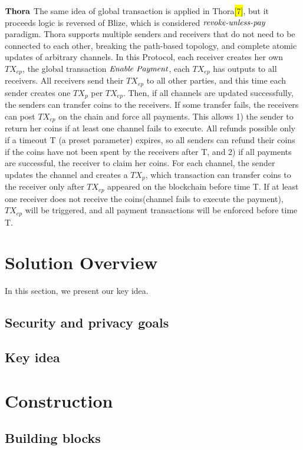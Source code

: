 \documentclass[conference]{IEEEtran}
\begin{document}
\noindent $\bf{Thora}$   The same idea of global transaction is applied in Thora\colorbox{yellow}{[7]}, but it proceeds logic is reversed 
of Blize, which is considered $\emph{revoke-unless-pay}$ paradigm. Thora supports multiple senders and receivers that do not need to be 
connected to each other, breaking the path-based topology, and complete atomic updates of arbitrary channels. In this Protocol, each 
receiver creates her own $TX_{ep}$, the global transaction $\emph{Enable Payment}$, each $TX_{ep}$ has outputs to all receivers. 
All receivers send their $TX_{ep}$ to all other parties, and this time each sender creates one $TX_p$ per $TX_{ep}$. Then, if all 
channels are updated successfully, the senders can transfer coins to the receivers. If some transfer fails, the receivers can post 
$TX_{ep}$ on the chain and force all payments. This allows 1) the sender to return her coins if at least one channel fails to execute. 
All refunds possible only if a timeout T (a preset parameter) expires, so all senders can refund their coins if the coins have not been 
spent by the receivers after T, and 2) if all payments are successful, the receiver to claim her coins. For each channel, the sender 
updates the channel and creates a $TX_p$, which transaction can transfer coins to the receiver only after $TX_{ep}$ appeared on the 
blockchain before time T. If at least one receiver does not receive the coins(channel fails to execute the payment), $TX_{ep}$ will be 
triggered, and all payment transactions will be enforced before time T.

\section{Solution Overview}
In this section, we present our key idea.

\subsection{Security and privacy goals}

\subsection{Key idea}

\section{Construction}

\subsection{Building blocks}
\end{document}
